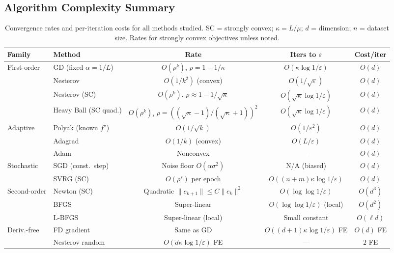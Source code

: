 \documentclass[11pt,a4paper]{article}
\theoremstyle{definition}
\begin{document}
\subsection{Algorithm Complexity Summary}

\begin{table}[H]
\centering
\caption{Convergence rates and per-iteration costs for all methods studied. SC = strongly convex; $\kappa = L/\mu$; $d$ = dimension; $n$ = dataset size. Rates for strongly convex objectives unless noted.}
\label{tab:complexity}
\begin{tabular}{llccc}
\toprule
\textbf{Family} & \textbf{Method} & \textbf{Rate} & \textbf{Iters to $\varepsilon$} & \textbf{Cost/iter} \\
\midrule
First-order & GD (fixed $\alpha = 1/L$) & $O(\rho^k)$, $\rho = 1-1/\kappa$ & $O(\kappa \log 1/\varepsilon)$ & $O(d)$ \\
 & Nesterov & $O(1/k^2)$ (convex) & $O(1/\sqrt{\varepsilon})$ & $O(d)$ \\
 & Nesterov (SC) & $O(\rho^k)$, $\rho \approx 1-1/\sqrt{\kappa}$ & $O(\sqrt{\kappa}\log 1/\varepsilon)$ & $O(d)$ \\
 & Heavy Ball (SC quad.) & $O(\rho^k)$, $\rho = ((\sqrt{\kappa}-1)/(\sqrt{\kappa}+1))^2$ & $O(\sqrt{\kappa}\log 1/\varepsilon)$ & $O(d)$ \\
\midrule
Adaptive & Polyak (known $f^{\star}$) & $O(1/\sqrt{k})$ & $O(1/\varepsilon^2)$ & $O(d)$ \\
 & Adagrad & $O(1/k)$ (convex) & $O(L/\varepsilon)$ & $O(d)$ \\
 & Adam & Nonconvex & --- & $O(d)$ \\
\midrule
Stochastic & SGD (const.\ step) & Noise floor $O(\alpha\sigma^2)$ & N/A (biased) & $O(d)$ \\
 & SVRG (SC) & $O(\rho^s)$ per epoch & $O((n+m)\kappa\log 1/\varepsilon)$ & $O(d)$ \\
\midrule
Second-order & Newton (SC) & Quadratic $\|e_{k+1}\| \leq C\|e_k\|^2$ & $O(\log\log 1/\varepsilon)$ & $O(d^3)$ \\
 & BFGS & Super-linear & $O(\log\log 1/\varepsilon)$ (local) & $O(d^2)$ \\
 & L-BFGS & Super-linear (local) & Small constant & $O(\ell d)$ \\
\midrule
Deriv.-free & FD gradient & Same as GD & $O((d+1)\kappa\log 1/\varepsilon)$ FE & $O(d)$ FE \\
 & Nesterov random & $O(d\kappa\log 1/\varepsilon)$ FE & --- & $2$ FE \\

\end{tabular}
\end{table}
\end{document}

